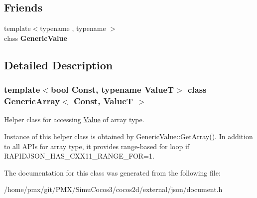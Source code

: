 \subsection*{Friends}
\begin{DoxyCompactItemize}
\item 
\mbox{\label{classGenericArray_a899449e1a645b5e377af059fb61113d8}} 
{\footnotesize template$<$typename , typename $>$ }\\class {\bfseries Generic\+Value}
\end{DoxyCompactItemize}


\subsection{Detailed Description}
\subsubsection*{template$<$bool Const, typename ValueT$>$\newline
class Generic\+Array$<$ Const, Value\+T $>$}

Helper class for accessing \hyperlink{classValue}{Value} of array type. 

Instance of this helper class is obtained by {\ttfamily Generic\+Value\+::\+Get\+Array()}. In addition to all A\+P\+Is for array type, it provides range-\/based for loop if {\ttfamily R\+A\+P\+I\+D\+J\+S\+O\+N\+\_\+\+H\+A\+S\+\_\+\+C\+X\+X11\+\_\+\+R\+A\+N\+G\+E\+\_\+\+F\+OR=1}. 

The documentation for this class was generated from the following file\+:\begin{DoxyCompactItemize}
\item 
/home/pmx/git/\+P\+M\+X/\+Simu\+Cocos3/cocos2d/external/json/document.\+h\end{DoxyCompactItemize}
